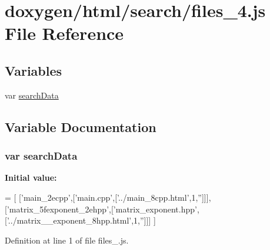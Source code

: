 \hypertarget{a00077}{}\section{doxygen/html/search/files\+\_\+4.js File Reference}
\label{a00077}
\subsection*{Variables}
\begin{DoxyCompactItemize}
\item 
var \hyperlink{a00077_ad01a7523f103d6242ef9b0451861231e}{search\+Data}
\end{DoxyCompactItemize}


\subsection{Variable Documentation}
\hypertarget{a00077_ad01a7523f103d6242ef9b0451861231e}{}
\subsubsection[{search\+Data}]{\setlength{\rightskip}{0pt plus 5cm}var search\+Data}\label{a00077_ad01a7523f103d6242ef9b0451861231e}
{\bfseries Initial value\+:}
\begin{DoxyCode}
=
[
  [\textcolor{stringliteral}{'main\_2ecpp'},[\textcolor{stringliteral}{'main.cpp'},[\textcolor{stringliteral}{'../main\_8cpp.html'},1,\textcolor{stringliteral}{''}]]],
  [\textcolor{stringliteral}{'matrix\_5fexponent\_2ehpp'},[\textcolor{stringliteral}{'matrix\_exponent.hpp'},[\textcolor{stringliteral}{'../matrix\_\_exponent\_8hpp.html'},1,\textcolor{stringliteral}{''}]]]
]
\end{DoxyCode}


Definition at line 1 of file files\+\_.\+js.

